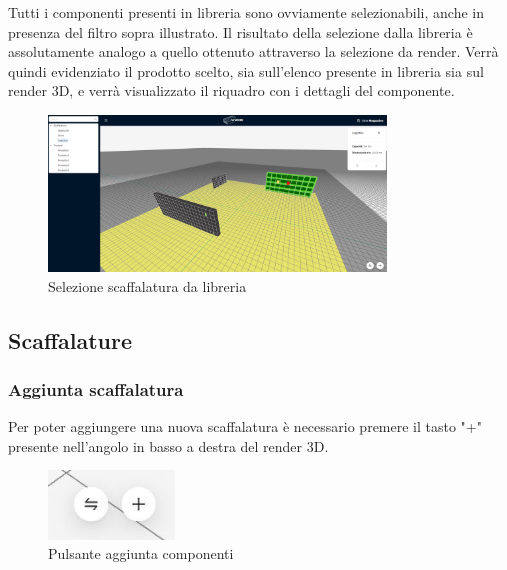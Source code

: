                \noindent Tutti i componenti presenti in libreria sono ovviamente selezionabili, anche in presenza del filtro sopra illustrato. Il risultato della selezione dalla 
                libreria è assolutamente analogo a quello ottenuto attraverso la selezione da render. Verrà quindi evidenziato il prodotto scelto, sia sull'elenco presente in 
                libreria sia sul render 3D, e verrà visualizzato il riquadro con i dettagli del componente. \\
                \begin{figure}[h!]
                    \centering
                    \includegraphics[width=0.8\textwidth]{images/selezione_scaffalatura.png}
                    \caption{Selezione scaffalatura da libreria}
                \end{figure}

    


    \newpage
    \subsection{Scaffalature}\label{sec:scaffalature}
        \subsubsection{Aggiunta scaffalatura}\label{sec:scaffalature:aggiunta}
            Per poter aggiungere una nuova scaffalatura è necessario premere il tasto "+" presente nell'angolo in basso a destra del render 3D.\\
            \begin{figure}[h!]
                \centering
                \includegraphics[width=0.3\textwidth]{images/aggiunta_spostamenti.png}
                \caption{Pulsante aggiunta componenti}
            \end{figure}

